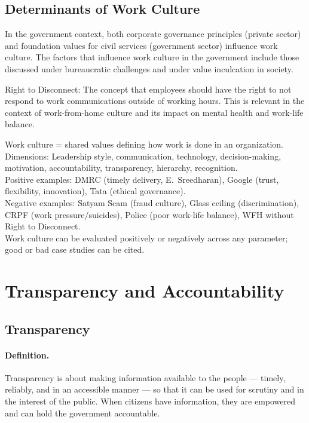 \subsection{Determinants of Work Culture}
In the government context, both corporate governance principles (private sector) and foundation values for civil services (government sector) influence work culture. The factors that influence work culture in the government include those discussed under bureaucratic challenges and under value inculcation in society.

\begin{GovtPolicy}
Right to Disconnect: The concept that employees should have the right to not respond to work communications outside of working hours. This is relevant in the context of work-from-home culture and its impact on mental health and work-life balance.
\end{GovtPolicy}

\begin{QuickRevision}
Work culture = shared values defining how work is done in an organization.\\
Dimensions: Leadership style, communication, technology, decision-making, motivation, accountability, transparency, hierarchy, recognition.\\
Positive examples: DMRC (timely delivery, E.\ Sreedharan), Google (trust, flexibility, innovation), Tata (ethical governance).\\
Negative examples: Satyam Scam (fraud culture), Glass ceiling (discrimination), CRPF (work pressure/suicides), Police (poor work-life balance), WFH without Right to Disconnect.\\
Work culture can be evaluated positively or negatively across any parameter; good or bad case studies can be cited.
\end{QuickRevision}

\section{Transparency and Accountability}

\subsection{Transparency}

\paragraph{Definition.} Transparency is about making information available to the people --- timely, reliably, and in an accessible manner --- so that it can be used for scrutiny and in the interest of the public. When citizens have information, they are empowered and can hold the government accountable.


